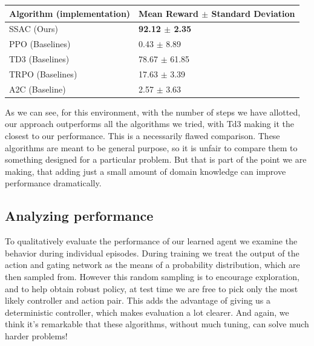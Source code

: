 \documentclass[letterpaper, 10 pt, conference]{ieeeconf}
\begin{document}
\begin{center}
\begin{tabu}{| X[l] | X[l] |}
\hline
Algorithm (implementation) & Mean Reward $\pm$ Standard Deviation\\
 \hline
 SSAC (Ours) & \bf{92.12 $\pm$ 2.35}  \\ 
 \hline
 PPO (Baselines) &  0.43 $\pm$ 8.89 \\ 
 \hline
 TD3 (Baselines)  & 78.67  $\pm$ 61.85 \\
 \hline
 TRPO (Baselines) &  17.63 $\pm$ 3.39 \\
 \hline
 A2C (Baseline)   & 2.57 $\pm$ 3.63 \\
 \hline
\end{tabu}
\label{table:results}
\end{center}

As we can see, for this environment, with the number of steps we have allotted, our approach outperforms all the algorithms we tried, with Td3 making it the closest to our performance. This is a necessarily flawed comparison. These algorithms are meant to be general purpose, so it is unfair to compare them to something designed for a particular problem. But that is part of the point we are making, that adding just a small amount of domain knowledge can improve performance dramatically.

\subsection{Analyzing performance}

To qualitatively evaluate the performance of our learned agent we examine the behavior during individual episodes. During training we treat the output of the action and gating network as the means of a probability distribution, which are then sampled from. However this random sampling is to encourage exploration, and to help obtain robust policy, at test time we are free to pick only the most likely controller and action pair. This adds the advantage of giving us a deterministic controller, which makes evaluation a lot clearer. And again, we think it's remarkable that these algorithms, without much tuning, can solve much harder problems!
\end{document}
